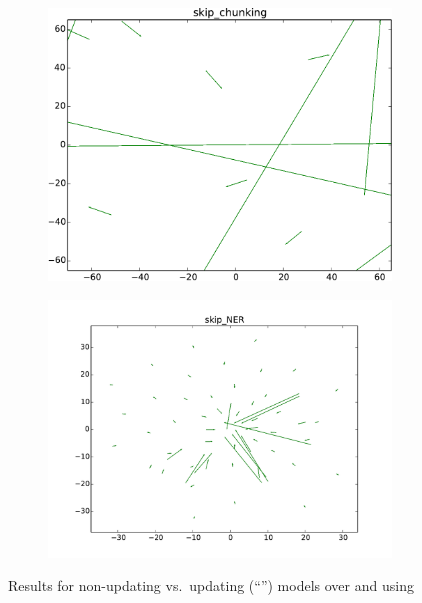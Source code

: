 \begin{figure}[t!]
\centering
\begin{subfigure}[b]{0.48\textwidth}
	\centering
    \includegraphics[width=\textwidth]{plots/vectorField/Lizhen/scaled/Lizhen_skip_chunking}
	\subcaption{\chunking}	
	\label{fig:skipChu}
\end{subfigure}
\begin{subfigure}[b]{0.48\textwidth}
	\centering
    \includegraphics[width=\textwidth]{plots/vectorField/Lizhen/Lizhen_skip_NER}    	
	\subcaption{\ner}
	\label{fig:skippos}	
\end{subfigure}
\caption{Results for non-updating vs.\ updating (``\withup'') models over \pos and \chunking using \Skipgram[\withup]}
\label{fig:vectorfield}
\end{figure}

